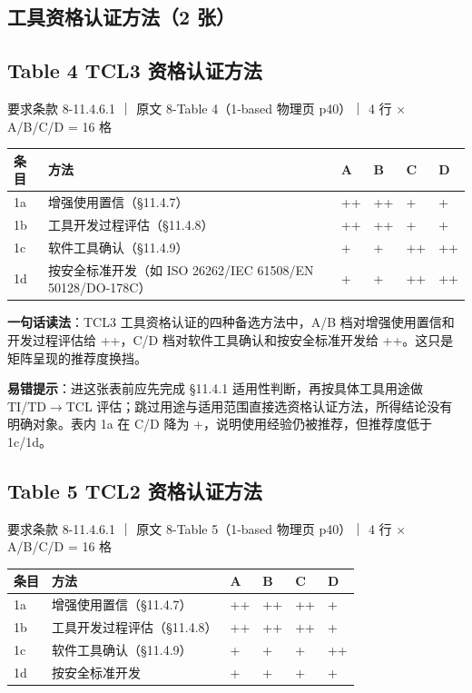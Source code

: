 \subsection{工具资格认证方法（2 张）}

\subsection{Table 4 TCL3 资格认证方法}

要求条款 8-11.4.6.1 ｜ 原文 8-Table 4（1-based 物理页 p40）｜ 4 行 \(\times\) A/B/C/D = 16 格

\begin{center}
\begingroup\small
\setlength{\tabcolsep}{4pt}
\begin{tabularx}{\linewidth}{@{}XXXXXX@{}}
\toprule
条目 & 方法 & A & B & C & D \\
\midrule
1a & 增强使用置信（§11.4.7） & ++ & ++ & + & + \\
1b & 工具开发过程评估（§11.4.8） & ++ & ++ & + & + \\
1c & 软件工具确认（§11.4.9） & + & + & ++ & ++ \\
1d & 按安全标准开发（如 ISO 26262/IEC 61508/EN 50128/DO-178C） & + & + & ++ & ++ \\
\bottomrule
\end{tabularx}
\endgroup
\end{center}

\textbf{一句话读法}：TCL3 工具资格认证的四种备选方法中，A/B 档对增强使用置信和开发过程评估给 ++，C/D 档对软件工具确认和按安全标准开发给 ++。这只是矩阵呈现的推荐度换挡。

\textbf{易错提示}：进这张表前应先完成 §11.4.1 适用性判断，再按具体工具用途做 TI/TD\(\rightarrow\)TCL 评估；跳过用途与适用范围直接选资格认证方法，所得结论没有明确对象。表内 1a 在 C/D 降为 +，说明使用经验仍被推荐，但推荐度低于 1c/1d。

\subsection{Table 5 TCL2 资格认证方法}

要求条款 8-11.4.6.1 ｜ 原文 8-Table 5（1-based 物理页 p40）｜ 4 行 \(\times\) A/B/C/D = 16 格

\begin{center}
\begingroup\small
\setlength{\tabcolsep}{4pt}
\begin{tabularx}{\linewidth}{@{}XXXXXX@{}}
\toprule
条目 & 方法 & A & B & C & D \\
\midrule
1a & 增强使用置信（§11.4.7） & ++ & ++ & ++ & + \\
1b & 工具开发过程评估（§11.4.8） & ++ & ++ & ++ & + \\
1c & 软件工具确认（§11.4.9） & + & + & + & ++ \\
1d & 按安全标准开发 & + & + & + & + \\
\bottomrule
\end{tabularx}
\endgroup
\end{center}

